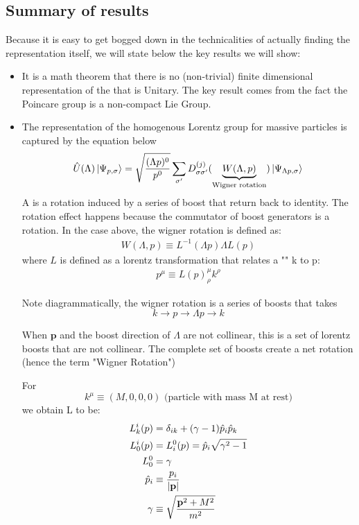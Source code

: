 \documentclass[12pt]{scrartcl}
\begin{document}
\subsection{Summary of results}
Because it is easy to get bogged down in the technicalities of actually finding the representation itself, we will state below the key results we will show:
\begin{itemize}
\item It is a math theorem that there is no (non-trivial) finite dimensional representation of the  that is Unitary.   The key result comes from the fact the Poincare group is a non-compact Lie Group.
\item The representation of the homogenous Lorentz group for massive particles is captured by the equation below
\begin{align}
\hat{U}(\Lambda ) \ket{\Psi_{p, \sigma}} = \sqrt{(\Lambda p)^0 \over p^0} \sum_{\sigma'} D_{\sigma \sigma'}^{(j)} (\underbrace{W(\Lambda, p)}_{\text{Wigner rotation}}) \ket{ \Psi_{\Lambda p, \sigma}}  
\end{align}
A  is a rotation induced by a series of boost that return back to identity.  The rotation effect happens because the commutator of boost generators is a rotation.  In the case above, the wigner rotation is defined as:
\begin{align}
W(\Lambda, p) \equiv L^{-1} (\Lambda p) \Lambda L(p)
\end{align}
where $L$ is defined as a lorentz transformation that relates a "" k to p:
\begin{align}
p^\mu \equiv L(p)^{\mu}_\rho k^\rho
\end{align}

Note diagrammatically, the wigner rotation is a series of boosts that takes
$$ k \rightarrow p \rightarrow \Lambda p \rightarrow k$$ 

When $\mathbf{p}$ and the boost direction of $\Lambda$ are not collinear, this is a set of lorentz boosts
that are not collinear.  The complete set of boosts create a net rotation (hence the term "Wigner Rotation")

For $$k^\mu \equiv(M, 0, 0, 0) \text{ (particle with mass M at rest)}$$
we obtain L to be:
\begin{align}
L^{i}_k(p) &= \delta_{ik} + (\gamma - 1) \hat{p}_i \hat{p}_k \\
L^{i}_0(p) &= L^{0}_i(p) = \hat{p}_i \sqrt{\gamma^2 - 1} \\
L^{0}_0 &= \gamma \\
\hat{p}_i & \equiv {p_i \over |\mathbf{p}|} \\
\gamma & \equiv \sqrt{\mathbf{p}^2 + M^2 \over m^2}
\end{align}


\end{itemize}
\end{document}
